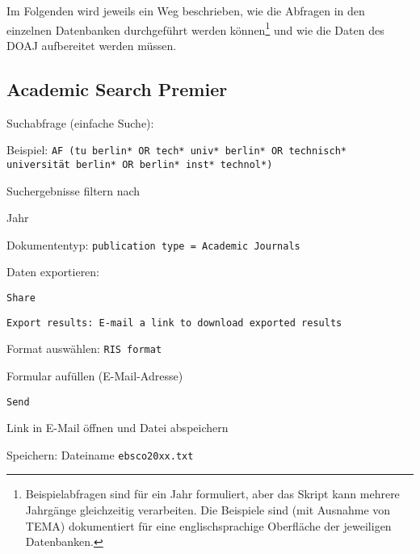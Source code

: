 Im Folgenden wird jeweils ein Weg beschrieben, wie die Abfragen in den einzelnen Datenbanken durchgeführt werden können\footnote{Beispielabfragen sind für ein Jahr formuliert, aber das Skript kann mehrere Jahrgänge gleichzeitig verarbeiten. Die Beispiele sind (mit Ausnahme von TEMA) dokumentiert für eine englischsprachige Oberfläche der jeweiligen Datenbanken.} und wie die Daten des DOAJ aufbereitet werden müssen.

\label{used-DBs}
\subsection*{Academic Search Premier}
\begin{compactitem}
\item Suchabfrage (einfache Suche): 
	\begin{compactitem}
	\item Beispiel: \texttt{AF (tu berlin* OR tech* univ* berlin* OR technisch* \newline universität berlin* OR berlin* inst* technol*)}
	\end{compactitem}
\item Suchergebnisse filtern nach
	\begin{compactitem}
    \item Jahr
    \item Dokumententyp: \texttt{publication type = Academic Journals}
    \end{compactitem}
\item Daten exportieren: 
	\begin{compactitem}
	\item \texttt{Share}
    \item \texttt{Export results: E-mail a link to download exported results}
    \item Format auswählen: \texttt{RIS format}
    \item Formular aufüllen (E-Mail-Adresse)
    \item \texttt{Send}
    \item Link in E-Mail öffnen und Datei abspeichern
	\end{compactitem}
\item Speichern: Dateiname \texttt{ebsco20xx.txt}
\end{compactitem}

